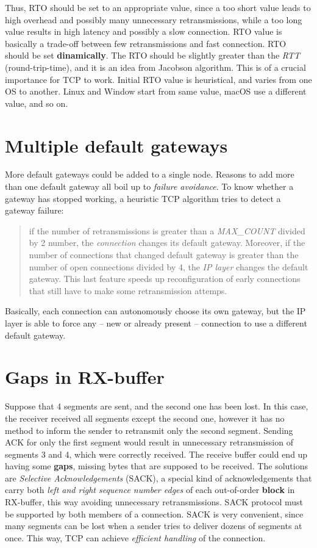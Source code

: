 \documentclass[10pt]{book}
\begin{document}
Thus, RTO should be set to an appropriate value, since a too short value leads
to high overhead and possibly many unnecessary retransmissions, while a too
long value results in high latency and possibly a slow connection. RTO value is
basically a trade-off between few retransmissions and fast connection. RTO
should be set \textbf{dinamically}. The RTO should be slightly greater than the
\emph{RTT} (round-trip-time), and it is an idea from Jacobson algorithm. This
is of a crucial importance for TCP to work. Initial RTO value is heuristical,
and varies from one OS to another. Linux and Window start from same value,
macOS use a different value, and so on.

\section{Multiple default gateways}

More default gateways could be added to a single node. Reasons to add more than
one default gateway all boil up to \emph{failure avoidance}. To know whether a
gateway has stopped working, a heuristic TCP algorithm tries to detect a gateway failure:

\begin{quote}
	if the number of retransmissions is greater than a \emph{MAX\_COUNT}
	divided by 2 number, the \emph{connection} changes its default gateway.
	Moreover, if the number of connections that changed default gateway is
	greater than the number of open connections divided by 4, the \emph{IP
	layer} changes the default gateway. This last feature speeds up
	reconfiguration of early connections that still have to make some
	retransmission attemps.
\end{quote}

Basically, each connection can autonomously choose its own gateway, but the IP
layer is able to force any \--- new or already present \--- connection to use a
different default gateway.

\section{Gaps in RX-buffer}

Suppose that 4 segments are sent, and the second one has been lost. In this
case, the receiver received all segments except the second one, however it has
no method to inform the sender to retransmit only the second segment. Sending
ACK for only the first segment would result in unnecessary retransmission of
segments 3 and 4, which were correctly received. The receive buffer could end
up having some \textbf{gaps}, missing bytes that are supposed to be received.
The solutions are \emph{Selective Acknowledgements} (SACK), a special kind of
acknowledgements that carry both \emph{left and right sequence number edges} of
each out-of-order \textbf{block} in RX-buffer, this way avoiding unnecessary
retransmissions. SACK protocol must be supported by both members of a
connection. SACK is very convenient, since many segments can be lost when a
sender tries to deliver dozens of segments at once. This way, TCP can achieve
\emph{efficient handling} of the connection.
\end{document}
